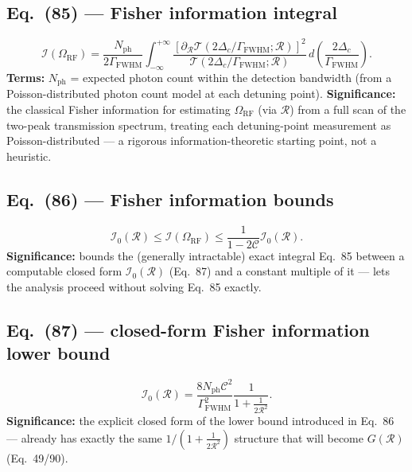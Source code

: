 \documentclass[11pt]{article}
\begin{document}
\subsection*{Eq.~(85) --- Fisher information integral}
\begin{equation}
\mathcal I(\Omega_\text{RF}) = \frac{N_\text{ph}}{2\Gamma_\text{FWHM}}\int_{-\infty}^{+\infty}\frac{[\partial_{\mathcal R}\mathcal T(2\Delta_c/\Gamma_\text{FWHM};\mathcal R)]^2}{\mathcal T(2\Delta_c/\Gamma_\text{FWHM};\mathcal R)}\,d\left(\frac{2\Delta_c}{\Gamma_\text{FWHM}}\right). \tag{85}
\end{equation}
\textbf{Terms:} $N_\text{ph}$ = expected photon count within the
detection bandwidth (from a Poisson-distributed photon count model at
each detuning point).
\textbf{Significance:} the classical Fisher information for estimating
$\Omega_\text{RF}$ (via $\mathcal R$) from a full scan of the two-peak
transmission spectrum, treating each detuning-point measurement as
Poisson-distributed --- a rigorous information-theoretic starting point,
not a heuristic.

\subsection*{Eq.~(86) --- Fisher information bounds}
\begin{equation}
\mathcal I_0(\mathcal R) \le \mathcal I(\Omega_\text{RF}) \le \frac{1}{1-2\mathcal C}\mathcal I_0(\mathcal R). \tag{86}
\end{equation}
\textbf{Significance:} bounds the (generally intractable) exact
integral Eq.~85 between a computable closed form $\mathcal I_0(\mathcal
R)$ (Eq.~87) and a constant multiple of it --- lets the analysis
proceed without solving Eq.~85 exactly.

\subsection*{Eq.~(87) --- closed-form Fisher information lower bound}
\begin{equation}
\mathcal I_0(\mathcal R) = \frac{8N_\text{ph}\mathcal C^2}{\Gamma_\text{FWHM}^2}\frac{1}{1+\frac{1}{2\mathcal R^2}}. \tag{87}
\end{equation}
\textbf{Significance:} the explicit closed form of the lower bound
introduced in Eq.~86 --- already has exactly the same
$1/(1+\frac{1}{2\mathcal R^2})$ structure that will become $G(\mathcal
R)$ (Eq.~49/90).
\end{document}
